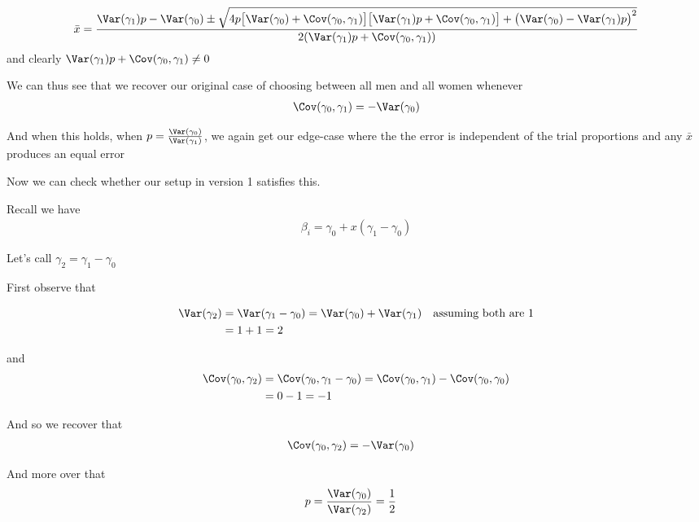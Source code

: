 \begin{align*}
	\bar{x} = \frac{\Var(\gamma_1) p - \Var(\gamma_0) \pm \sqrt{ 4 p \big[ \Var(\gamma_0) + \Cov(\gamma_0, \gamma_1) \big] \big[ \Var(\gamma_1) p + \Cov(\gamma_0, \gamma_1) \big] + \big(\Var(\gamma_0) - \Var(\gamma_1) p\big)^2 } }{ 2 (\Var(\gamma_1) p + \Cov(\gamma_0, \gamma_1)) } 
\end{align*} 
and clearly $\Var(\gamma_1) p + \Cov(\gamma_0, \gamma_1) \neq 0$


We can thus see that we recover our original case of choosing between all men and all women whenever
\begin{align*}
	\Cov(\gamma_0, \gamma_1) = - \Var(\gamma_0)
\end{align*} 

And when this holds, when $p = \frac{\Var(\gamma_0)}{\Var(\gamma_1)}$, we again get our edge-case where the the error is independent of the trial proportions and any $\bar{x}$ produces an equal error

Now we can check whether our setup in version 1 satisfies this.

Recall we have
\begin{align*}
	\beta_i = \gamma_0 + x ( \gamma_1 - \gamma_0)
\end{align*} 

Let's call $\gamma_2 = \gamma_1 - \gamma_0$

First observe that 

\begin{align*}
	\Var(\gamma_2) &= \Var(\gamma_1 - \gamma_0) = \Var(\gamma_0) + \Var(\gamma_1) \quad \text{assuming both are 1} \\
				   &= 1 + 1 = 2
\end{align*} 

and 
\begin{align*}
	\Cov(\gamma_0, \gamma_2)	&= \Cov(\gamma_0, \gamma_1 - \gamma_0) = \Cov(\gamma_0, \gamma_1) - \Cov(\gamma_0, \gamma_0) \\
										&= 0 - 1 = -1
\end{align*} 

And so we recover that
\begin{align*}
	\Cov(\gamma_0, \gamma_2) &= -\Var(\gamma_{0})
\end{align*} 

And more over that
\begin{align*}
	p = \frac{\Var(\gamma_0)}{\Var(\gamma_2)} &= \frac{1}{2}
\end{align*} 

